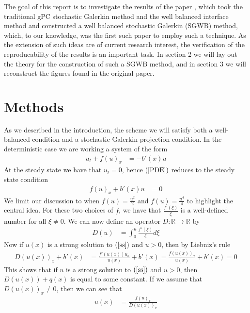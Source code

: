 \documentclass[12pt]{article}
\begin{document}
The goal of this report is to investigate the results of the paper \cite{Jin2015}, which took the traditional gPC stochastic Galerkin method and the well balanced interface method and constructed a well balanced stochastic Galerkin (SGWB) method, which, to our knowledge, was the first such paper to employ such a technique.
As the extension of such ideas are of current research interest, the verification of the reproducability of the results is an important task.
In section 2 we will lay out the theory for the construction of such a SGWB method, and in section 3 we will reconstruct the figures found in the original paper.

\section{Methods}
As we described in the introduction, the scheme we will satisfy both a well-balanced condition and a stochastic Galerkin projection condition. In the deterministic case we are working a system of the form
\begin{align}
    u_t + f(u)_x &= -b'(x)u \label{PDE}
\end{align}
At the steady state we have that $u_t = 0$, hence $(\ref{PDE})$ reduces to the steady state condition
\begin{align}
    f(u)_x +b'(x)u &= 0 \label{ss}
\end{align}
We limit our discussion to when $f(u) = \frac{u^2}{2}$ and $f(u) = \frac{u^4}{4}$ to highlight the central idea. For these two choices of $f$, we have that $\frac{f'(\xi)}{\xi}$ is a well-defined number for all $\xi \neq 0$. We can now define an operator $D:\mathbb{R}\to\mathbb{R}$ by
\begin{align*}
    D(u) &= \int_0^{u}\frac{f'(\xi)}{\xi}d\xi
\end{align*}
Now if $u(x)$ is a strong solution to $(\ref{ss})$ and $u > 0$, then by Liebniz's rule
\begin{align*}
    D(u(x))_x + b'(x) &= \frac{f'(u(x))u_x}{u(x)} + b'(x) = \frac{f(u(x))_x}{u(x)} + b'(x) = 0
\end{align*}
This shows that if $u$ is a strong solution to $(\ref{ss})$ and $u > 0$, then $D(u(x)) + q(x)$ is equal to some constant. If we assume that $D(u(x))_x\not=0$, then we can see that
\begin{align}
    u(x) &= \frac{f(u)_x}{D(u(x))_x}\label{u(x)}
\end{align}
\end{document}
